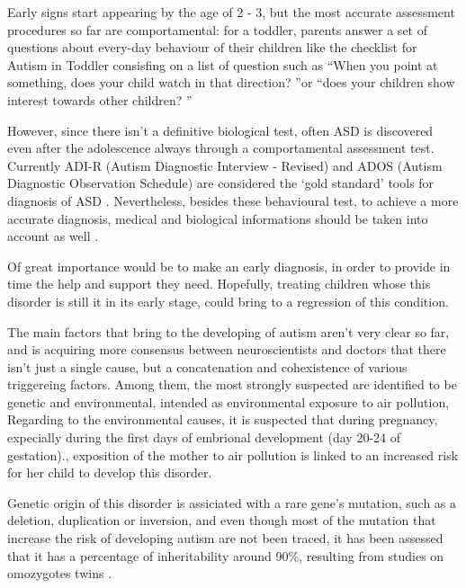 \documentclass[11pt]{report}
\begin{document}

Early signs start appearing by the age of 2 - 3, but the most accurate assessment procedures so far are comportamental: for a toddler, parents answer a set of questions about every-day behaviour of their children like the checklist for Autism in Toddler \cite{robins-2009} consisfing on a list of question such as \textquotedblleft When you point at something, does your child watch in that direction? \textquotedblright or \textquotedblleft does your children show interest towards other children? \textquotedblright

However, since there isn't a definitive biological test, often ASD is discovered even after the adolescence always through a comportamental assessment test.
Currently ADI-R (Autism Diagnostic Interview - Revised) and ADOS (Autism Diagnostic Observation Schedule) are considered the ‘gold standard’ tools for diagnosis of ASD \cite{ozonoff-2015} \cite{lecouteur-2008}.
Nevertheless, besides these behavioural test, to achieve a more accurate diagnosis, medical and biological informations should be taken into account as well .

Of great importance would be to make an early diagnosis, in order to provide in time the help and support they need. Hopefully, treating children whose this disorder is still it in its early stage, could bring to a regression of this condition.

The main factors that bring to the developing of autism aren't very clear so far, and is acquiring more consensus between neuroscientists and doctors that there isn't just a single cause, but a concatenation and cohexistence of various triggereing factors.
Among them, the most strongly suspected are identified to be genetic and environmental, intended as environmental exposure to air pollution,
Regarding to the environmental causes, it is suspected that during pregnancy, expecially during the first days of embrional development (day 20-24 of gestation).\cite{ratajczak-2011}, exposition of the mother to air pollution is linked to an increased risk for her child to develop this disorder.

Genetic origin of this disorder is assiciated with a rare gene's mutation, such as a deletion, duplication or inversion, and even though most of the mutation that increase the risk of developing autism are not been traced, it has been assessed that it has a percentage of inheritability around 90\%, resulting from studies on omozygotes twins \cite{freitag-2007}.
\end{document}
